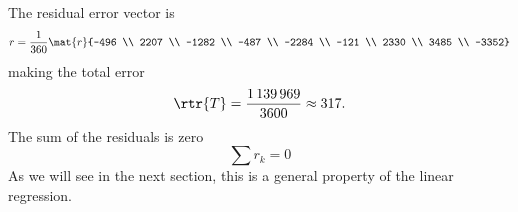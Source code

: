 The residual error vector is
  \begin{equation}
      r = \frac{1}{360}
          \mat{r}{-496 \\ 2207 \\ -1282 \\ -487 \\ -2284 \\ -121 \\ 2330 \\ 3485 \\ -3352}
  \end{equation}
making the total error
  \begin{equation}
      \rtr{T} = \frac{1\,139\,969}{3600} \approx 317.
  \end{equation}
The sum of the residuals is zero
  \begin{equation}
    \sum r_{k}=0
  \end{equation}
As we will see in the next section, this is a general property of the linear regression.

